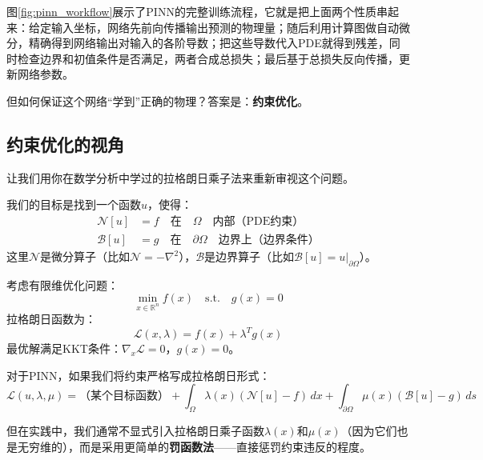图\ref{fig:pinn_workflow}展示了PINN的完整训练流程，它就是把上面两个性质串起来：给定输入坐标，网络先前向传播输出预测的物理量；随后利用计算图做自动微分，精确得到网络输出对输入的各阶导数；把这些导数代入PDE就得到残差，同时检查边界和初值条件是否满足，两者合成总损失；最后基于总损失反向传播，更新网络参数。

但如何保证这个网络“学到”正确的物理？答案是：\textbf{约束优化}。

\subsection{约束优化的视角}

让我们用你在数学分析中学过的拉格朗日乘子法来重新审视这个问题。

我们的目标是找到一个函数$u$，使得：
\begin{align}
    \mathcal{N}[u] &= f \quad \text{在} \quad \Omega \quad \text{内部（PDE约束）} \\
    \mathcal{B}[u] &= g \quad \text{在} \quad \partial\Omega \quad \text{边界上（边界条件）}
\end{align}
这里$\mathcal{N}$是微分算子（比如$\mathcal{N} = -\nabla^2$），$\mathcal{B}$是边界算子（比如$\mathcal{B}[u] = u|_{\partial\Omega}$）。

\begin{example}[回顾有限维拉格朗日乘子法]
考虑有限维优化问题：
\begin{equation}
    \min_{x \in \mathbb{R}^n} f(x) \quad \text{s.t.} \quad g(x) = 0
\end{equation}
拉格朗日函数为：
\begin{equation}
    \mathcal{L}(x, \lambda) = f(x) + \lambda^T g(x)
\end{equation}
最优解满足KKT条件：$\nabla_x \mathcal{L} = 0$，$g(x) = 0$。
\end{example}

对于PINN，如果我们将约束严格写成拉格朗日形式：
\begin{equation}
    \mathcal{L}(u, \lambda, \mu) = \text{（某个目标函数）} + \int_\Omega \lambda(x) (\mathcal{N}[u] - f) \, dx + \int_{\partial\Omega} \mu(x) (\mathcal{B}[u] - g) \, ds
\end{equation}

但在实践中，我们通常不显式引入拉格朗日乘子函数$\lambda(x)$和$\mu(x)$（因为它们也是无穷维的），而是采用更简单的\textbf{罚函数法}——直接惩罚约束违反的程度。


